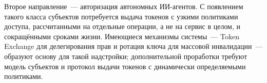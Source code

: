 Второе направление~--- авторизация автономных ИИ-агентов. С появлением
такого класса субъектов потребуется выдача токенов с узкими политиками
доступа, рассчитанными на отдельные операции, а не на сервис в целом,
и сокращёнными сроками жизни. Имеющиеся механизмы системы~--- Token Exchange
для делегирования прав и ротация ключа для массовой инвалидации~---
образуют основу для такой надстройки; дополнительной проработки требуют
модель субъектов и протокол выдачи токенов с динамически определяемыми
политиками.
